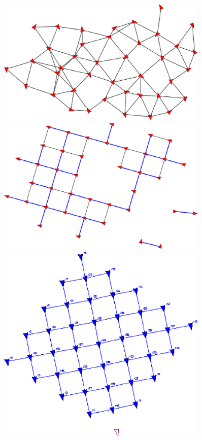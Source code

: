     \begin{figure}
        \centering
        \begin{minipage}{0.7\linewidth}
            \centering
            \includegraphics[width=0.9\textwidth]{figs/forty_sq_init}
        \end{minipage}
        \begin{minipage}{0.7\linewidth}
            \centering
            \includegraphics[width=0.9\textwidth]{figs/forty_sq_old}
        \end{minipage}
        \begin{minipage}{0.7\linewidth}
            \centering
            \includegraphics[width=0.9\textwidth]{figs/forty_sq_new}

\end{minipage}
\end{figure}

